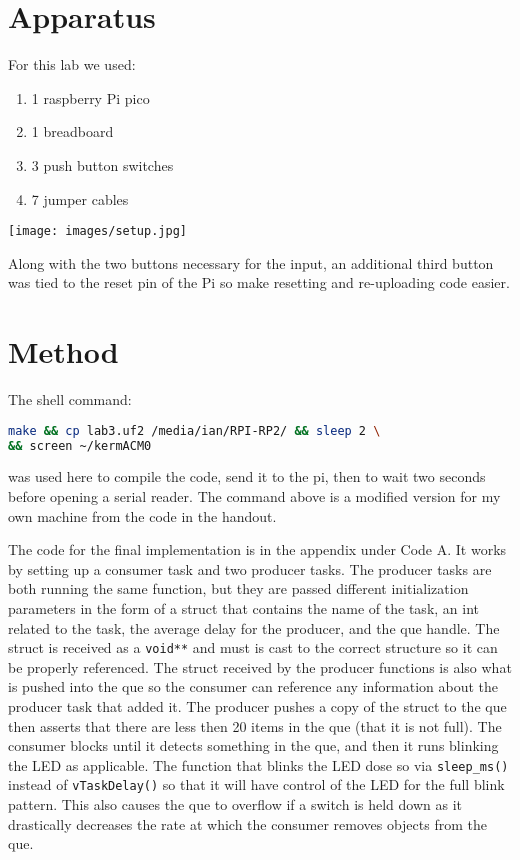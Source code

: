 \documentclass[sigconf]{article}
\begin{document}
\section*{Apparatus}

For this lab we used:
\begin{enumerate}
  \item 1 raspberry Pi pico 
  \item 1 breadboard
  \item 3 push button switches
  \item 7 jumper cables
\end{enumerate}

\texttt{[image: images/setup.jpg]}

Along with the two buttons necessary for the input, an additional third button was tied to the reset pin of the Pi so make resetting and re-uploading code easier.


\section*{Method}

The shell command: 

\begin{lstlisting}[basicstyle=\footnotesize\ttfamily, language=bash,breaklines]
make && cp lab3.uf2 /media/ian/RPI-RP2/ && sleep 2 \ 
&& screen ~/kermACM0
\end{lstlisting}

was used here to compile the code, send it to the pi, then to wait two seconds before opening a serial reader. The command above is a modified version for my own machine from the code in the handout. \

The code for the final implementation is in the appendix under Code A. It works by setting up a consumer task and two producer tasks. The producer tasks are both running the same function, but they are passed different initialization parameters in the form of a struct that contains the name of the task, an int related to the task, the average delay for the producer, and the que handle. The struct is received as a \lstinline{void**} and must is cast to the correct structure so it can be properly referenced. The struct received by the producer functions is also what is pushed into the que so the consumer can reference any information about the producer task that added it. The producer pushes a copy of the struct to the que then asserts that there are less then 20 items in the que (that it is not full). The consumer blocks until it detects something in the que, and then it runs blinking the LED as applicable. The function that blinks the LED dose so via \lstinline{sleep_ms()} instead of \lstinline{vTaskDelay()} so that it will have control of the LED for the full blink pattern. This also causes the que to overflow if a switch is held down as it drastically decreases the rate at which the consumer removes objects from the que. \
\end{document}
